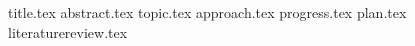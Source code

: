 \documentclass[11pt]{llncs}
\begin{document}
{title.tex}
\thispagestyle{plain}
{abstract.tex}
{topic.tex}
{approach.tex}
{progress.tex}
{plan.tex}
{literaturereview.tex}


\end{document}
